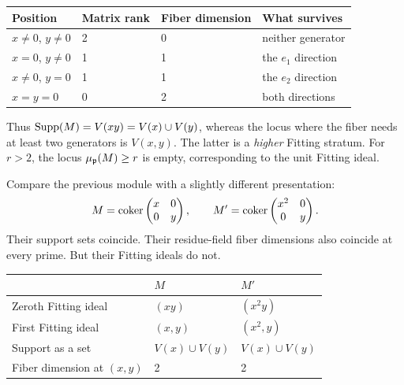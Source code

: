 \begin{center}\small
\begin{tabular}{@{}llll@{}}\toprule
Position & Matrix rank & Fiber dimension & What survives\\\midrule
$x\ne0$, $y\ne0$ & 2 & 0 & neither generator\\
$x=0$, $y\ne0$ & 1 & 1 & the $e_1$ direction\\
$x\ne0$, $y=0$ & 1 & 1 & the $e_2$ direction\\
$x=y=0$ & 0 & 2 & both directions\\\bottomrule
\end{tabular}
\end{center}
Thus $\operatorname{Supp}(M)=V(xy)=V(x)\cup V(y)$, whereas the locus where the fiber needs at least two generators is $V(x,y)$. The latter is a \emph{higher} Fitting stratum. For $r>2$, the locus $\mu_{\mathfrak p}(M)\ge r$ is empty, corresponding to the unit Fitting ideal.


Compare the previous module with a slightly different presentation:
\[
M=\operatorname{coker}\begin{pmatrix}x&0\\0&y\end{pmatrix},
\qquad
M'=\operatorname{coker}\begin{pmatrix}x^2&0\\0&y\end{pmatrix}.
\]
Their support sets coincide. Their residue-field fiber dimensions also coincide at every prime. But their Fitting ideals do not.

\begin{center}
\begin{tabular}{@{}lll@{}}\toprule
 & $M$ & $M'$\\\midrule
Zeroth Fitting ideal & $(xy)$ & $(x^2y)$\\
First Fitting ideal & $(x,y)$ & $(x^2,y)$\\
Support as a set & $V(x)\cup V(y)$ & $V(x)\cup V(y)$\\
Fiber dimension at $(x,y)$ & 2 & 2\\\bottomrule
\end{tabular}
\end{center}

